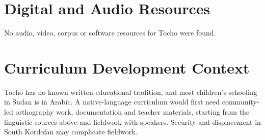\documentclass[12pt]{article}
\begin{document}
\section{Digital and Audio Resources}
No audio, video, corpus or software resources for Tocho were found.

\section{Curriculum Development Context}
Tocho has no known written educational tradition, and most children's schooling in Sudan is in Arabic. A native-language curriculum would first need community-led orthography work, documentation and teacher materials, starting from the linguistic sources above and fieldwork with speakers. Security and displacement in South Kordofan may complicate fieldwork.
\end{document}
